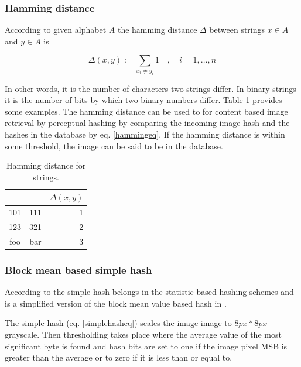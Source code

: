 \documentclass[english,12pt,a4paper,pdftex,elec,utf8]{aaltothesis}
\begin{document}
\subsubsection{Hamming distance}
According to \cite{Hamming1950} given alphabet $A$ the hamming distance $\Delta$ between strings $x \in A$ and $y \in A$ is

\begin{equation}\label{hammingeq}
\Delta(x,y):=\sum_{x_i\neq y_i}1\quad,\quad i=1,\ldots,n
\end{equation}

In other words, it is the number of characters two strings differ. In binary strings it is the number of bits by which two binary numbers differ. Table \ref{hammingexamples} provides some examples. The hamming distance can be used to for content based image retrieval by perceptual hashing by comparing the incoming image hash and the hashes in the database by eq. \ref{hammingeq}. If the hamming distance is within some threshold, the image can be said to be in the database.

\begin{table}[htb]
\caption{Hamming distance for strings.}
\label{hammingexamples}
\begin{center}
  \begin{tabular}{ccr}
&&$\Delta(x,y)$\\
    \hline \hline
    101 & 111 & 1\\
    \hline
    123 & 321 & 2\\
    \hline
    foo & bar & 3\\
    \hline
\end{tabular}
\end{center}\end{table}



\subsubsection{Block mean based simple hash}
According to \cite[p. 20]{Hadmi2012} the simple hash belongs in the statistic-based hashing schemes and is a simplified version of the block mean value based hash in \cite{Yang2006}.

The simple hash (eq. \ref{simplehasheq}) scales the image image to $8px * 8px$ grayscale. Then thresholding takes place where the average value of the most significant byte is found and hash bits are set to one if the image pixel MSB is greater than the average or to zero if it is less than or equal to.
\end{document}
